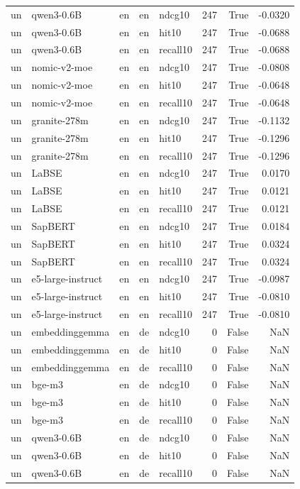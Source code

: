 \begin{tabular}{lllllrrr}
un & qwen3-0.6B & en & en & ndcg10 & 247 & True & -0.0320 \\
un & qwen3-0.6B & en & en & hit10 & 247 & True & -0.0688 \\
un & qwen3-0.6B & en & en & recall10 & 247 & True & -0.0688 \\
un & nomic-v2-moe & en & en & ndcg10 & 247 & True & -0.0808 \\
un & nomic-v2-moe & en & en & hit10 & 247 & True & -0.0648 \\
un & nomic-v2-moe & en & en & recall10 & 247 & True & -0.0648 \\
un & granite-278m & en & en & ndcg10 & 247 & True & -0.1132 \\
un & granite-278m & en & en & hit10 & 247 & True & -0.1296 \\
un & granite-278m & en & en & recall10 & 247 & True & -0.1296 \\
un & LaBSE & en & en & ndcg10 & 247 & True & 0.0170 \\
un & LaBSE & en & en & hit10 & 247 & True & 0.0121 \\
un & LaBSE & en & en & recall10 & 247 & True & 0.0121 \\
un & SapBERT & en & en & ndcg10 & 247 & True & 0.0184 \\
un & SapBERT & en & en & hit10 & 247 & True & 0.0324 \\
un & SapBERT & en & en & recall10 & 247 & True & 0.0324 \\
un & e5-large-instruct & en & en & ndcg10 & 247 & True & -0.0987 \\
un & e5-large-instruct & en & en & hit10 & 247 & True & -0.0810 \\
un & e5-large-instruct & en & en & recall10 & 247 & True & -0.0810 \\
un & embeddinggemma & en & de & ndcg10 & 0 & False & NaN \\
un & embeddinggemma & en & de & hit10 & 0 & False & NaN \\
un & embeddinggemma & en & de & recall10 & 0 & False & NaN \\
un & bge-m3 & en & de & ndcg10 & 0 & False & NaN \\
un & bge-m3 & en & de & hit10 & 0 & False & NaN \\
un & bge-m3 & en & de & recall10 & 0 & False & NaN \\
un & qwen3-0.6B & en & de & ndcg10 & 0 & False & NaN \\
un & qwen3-0.6B & en & de & hit10 & 0 & False & NaN \\
un & qwen3-0.6B & en & de & recall10 & 0 & False & NaN \\

\end{tabular}
